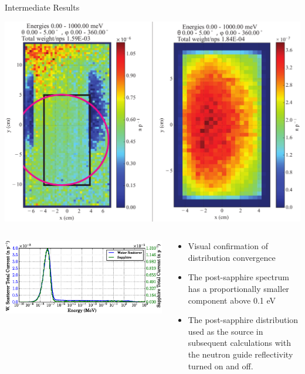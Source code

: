\documentclass[final,t]{beamer}
\begin{document}
\begin{frame}{}
\begin{columns}[t]
\begin{column}{.3\linewidth}
      \begin{block}{Intermediate Results}
      \vspace{-2ex}
      \begin{center}
      \includegraphics*[width=\linewidth]{dists.pdf}
      \end{center}

      \begin{columns}

      \begin{column}{0.5\linewidth}
      \vspace{-2ex}
        \includegraphics*[width=\linewidth]{specs_narrow.eps}
      \end{column}
      \begin{column}{0.5\linewidth}
      \vspace{-2ex}
      \begin{itemize}
        \item Visual confirmation of distribution convergence
        \item The post-sapphire spectrum has a proportionally smaller component above 0.1 eV
        \item The post-sapphire distribution used as the source in subsequent calculations with the neutron guide reflectivity turned on and off. 
        \end{itemize}
      \end{column}


\end{columns}
\end{block}
\end{column}
\end{columns}
\end{frame}
\end{document}
